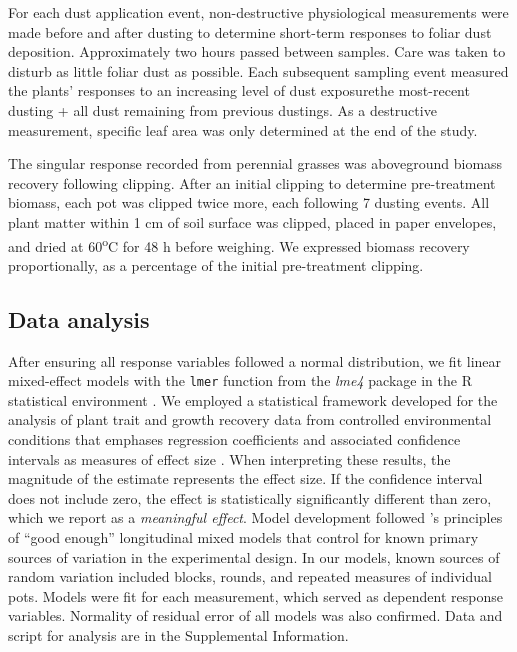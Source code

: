 \documentclass{svjour3}
\begin{document}
For each dust application event, non-destructive physiological measurements were made before and after dusting to determine short-term responses to foliar dust deposition. 
Approximately two hours passed between samples.
Care was taken to disturb as little foliar dust as possible.
Each subsequent sampling event measured the plants' responses to an increasing level of dust exposure\textemdash the most-recent dusting + all dust remaining from previous dustings. 
As a destructive measurement, specific leaf area was only determined at the end of the study. 

The singular response recorded from perennial grasses was aboveground biomass recovery following clipping. 
After an initial clipping to determine pre-treatment biomass, each pot was clipped twice more, each following 7 dusting events. 
All plant matter within 1 cm of soil surface was clipped, placed in paper envelopes, and dried at 60\textsuperscript{o}C for 48 h before weighing.
We expressed biomass recovery proportionally, as a percentage of the initial pre-treatment clipping. 

\subsection{Data analysis}

After ensuring all response variables followed a normal distribution, we fit linear mixed-effect models with the \texttt{lmer} function from the \emph{lme4} package in the \textsf{R} statistical environment \citep{bates2015, rcoreteam2019}. 
We employed a statistical framework developed for the analysis of plant trait and growth recovery data from controlled environmental conditions that emphases regression coefficients and associated confidence intervals as measures of effect size \citep{rinella2010,mcgranahan2018, mcgranahan2018b}. 
When interpreting these results, the magnitude of the estimate represents the effect size.
If the confidence interval does not include zero, the effect is statistically significantly different than zero, which we report as a \emph{meaningful effect}.
Model development followed \citet{cheng2010}'s principles of ``good enough'' longitudinal mixed models that control for known primary sources of variation in the experimental design. 
In our models, known sources of random variation included blocks, rounds, and repeated measures of individual pots. 
Models were fit for each measurement, which served as dependent response variables. 
Normality of residual error of all models was also confirmed. 
Data and script for analysis are in the Supplemental Information. 
\end{document}
